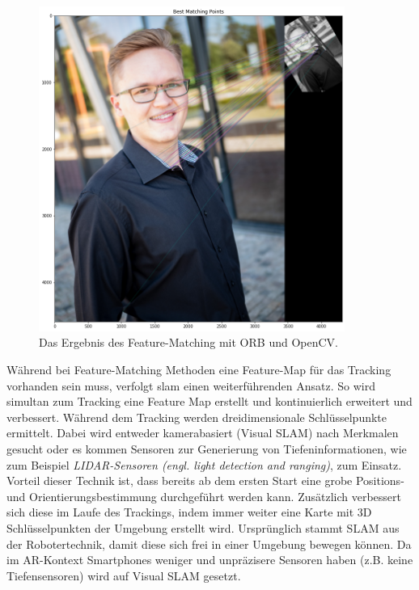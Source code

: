 \begin{figure}[H]
    \centering
    \includegraphics[width=10cm]{img/tracking/orb-3.png}
    \caption[Das Ergebnis des Feature-Matching mit ORB und OpenCV.]{Das Ergebnis des Feature-Matching mit ORB und OpenCV.\protect\footnotemark}
    \label{fig:orb-beispiel}
\end{figure}


Während bei Feature-Matching Methoden eine Feature-Map für das Tracking vorhanden sein muss, verfolgt \acrshort{slam}\cite{slam1}\cite{slam2} einen weiterführenden Ansatz. So wird simultan zum Tracking eine Feature Map erstellt und kontinuierlich erweitert und verbessert. Während dem Tracking werden dreidimensionale Schlüsselpunkte ermittelt. Dabei wird entweder kamerabasiert (Visual SLAM) nach Merkmalen gesucht oder es kommen Sensoren zur Generierung von Tiefeninformationen, wie zum Beispiel \textit{LIDAR-Sensoren (engl. light detection and ranging)}, zum Einsatz\cite[Liu et al.][]{Liu2020}. Vorteil dieser Technik ist, dass bereits ab dem ersten Start eine grobe Positions- und Orientierungsbestimmung durchgeführt werden kann. Zusätzlich verbessert sich diese im Laufe des Trackings, indem immer weiter eine Karte mit 3D Schlüsselpunkten der Umgebung erstellt wird. Ursprünglich stammt SLAM aus der Robotertechnik, damit diese sich frei in einer Umgebung bewegen können. Da im AR-Kontext Smartphones weniger und unpräzisere Sensoren haben (z.B. keine Tiefensensoren) wird auf Visual SLAM gesetzt\cite[Dörner(2019) Seite 143 f., ][]{doerner}\cite[Herling und Broll(2011)][]{herling2011}. 

